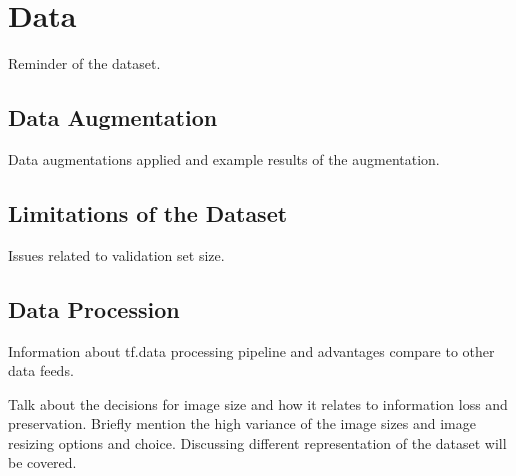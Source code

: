 \chapter{Data} \label{chap:data}
Reminder of the dataset.~\cite{openi} 

\section{Data Augmentation}
Data augmentations applied and example results of the augmentation.

\section{Limitations of the Dataset}
Issues related to validation set size.

\section{Data Procession}
Information about tf.data processing pipeline and advantages compare to other data feeds.

Talk about the decisions for image size and how it relates to information loss and preservation. Briefly mention the high variance of the image sizes and image resizing options and choice.
Discussing different representation of the dataset will be covered.
\clearpage